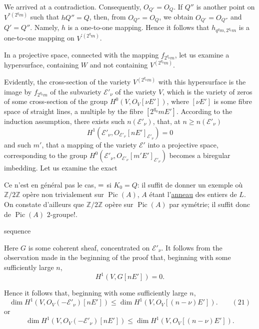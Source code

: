 We arrived at a contradiction. Consequently, $O_{Q'}=O_Q$. If $Q''$ is another point on $V^{*(2^qm)}$ such that $hQ''=Q$, then, from $O_{Q''}=O_Q$, we obtain $O_{Q'}=O_{Q''}$ and $Q'=Q''$. Namely, $h$ is a one-to-one mapping. Hence it follows that $h_{q^qm,2^{q_0}m}$ is a one-to-one mapping on $V^{\prime(2^qm)}$.

In a projective space, connected with the mapping $f_{2^{q_0}m}$, let us examine a hypersurface, containing $W$ and not containing $V^{(2^{q_0}m)}$.

Evidently, the cross-section of the variety $V^{(2^{q_0}m)}$ with this hypersurface is the image by $f_{2^{q_0}m}$ of the subvariety $\mathcal E'_\nu$ of the variety $V$, which is the variety of zeros of some cross-section of the group $H^0(V,O_V[\nu E'])$,  where $[\nu E']$ is some fibre space of straight lines, a multiple by the fibre $[2^{q_0}mE']$. According to the induction assumption, there exists such $n(\mathcal E'_\nu)$, that, at $n\ge n(\mathcal E'_\nu)$
\[
H^1(\mathcal E'_\nu,O_{\mathcal E'_\nu}[nE']_{\mathcal E'_\nu})=0
\]
and such $m'$, that a mapping of the variety $\mathcal E'$ into a projective space, corresponding to the group $H^0(\mathcal E'_\nu,O_{\mathcal E'_\nu}[m'E']_{\mathcal E'_\nu})$ becomes a biregular imbedding. Let us examine the exact

Ce n'est en général pas le cas, ${=}$ si $K_0=Q$: il suffit de donner un exemple où $\mathbb Z/2\mathbb Z$ opère non trivialement sur $\operatorname{Pic}(A)$, $A$ étant l'\uline{anneau}  des entiers de $L$. On constate d'ailleurs que $\mathbb Z/2\mathbb Z$ opère sur $\operatorname{Pic}(A)$ par symétrie; il suffit donc de  $\operatorname{Pic}(A)$  $2$-groupe!.

sequence

Here $G$ is some coherent sheaf, concentrated on $\mathcal E'_\nu$. It follows from the observation made in the beginning of the proof that, beginning with some sufficiently large $n$,
\[
H^1(V,G[nE'])=0.
\]

Hence it follows that, beginning with some sufficiently large $n$,
\[
\dim H^1(V,O_V(-\mathcal E'_\nu)[nE'])\le\dim H^1(V,O_V[(n-\nu)E']).\qquad (21)
\]
or
\[
\dim H^1(V,O_V(-\mathcal E'_\nu)[nE'])\le\dim H^1(V,O_V[(n-\nu)E']).
\]

